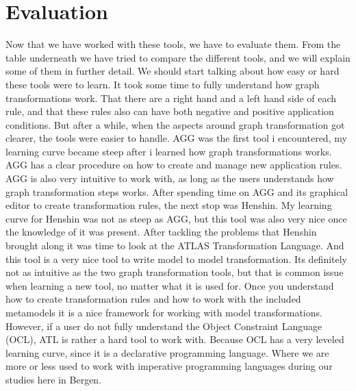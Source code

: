 \section{Evaluation}
\noindent Now that we have worked with these tools, we have to evaluate them.
From the table underneath we have tried to compare the different tools, and we
will explain some of them in further detail. We should start talking about how
easy or hard these tools were to learn. It took some time to fully understand
how graph transformations work. That there are a right hand and a left hand
side of each rule, and that these rules also can have both negative and
positive application conditions. But after a while, when the aspects around
graph transformation got clearer, the tools were easier to handle. AGG was the
first tool i encountered, my learning curve became steep after i learned how
graph transformations works. AGG has a clear procedure on how to create and
manage new application rules. AGG is also very intuitive to work with, as long
as the users understands how graph transformation steps works. After spending
time on AGG and its graphical editor to create transformation rules, the next
stop was Henshin. My learning curve for Henshin was not as steep as AGG, but
this tool was also very nice once the knowledge of it was present. After
tackling the problems that Henshin brought along it was time to look at the
ATLAS Transformation Language. And this tool is a very nice tool to write model
to model transformation. Its definitely not as intuitive as the two graph
transformation tools, but that is common issue when learning a new tool, no
matter what it is used for. Once you understand how to create transformation
rules and how to work with the included metamodels it is a nice framework for
working with model transformations. However, if a user do not fully understand
the Object Constraint Language (OCL), ATL is rather a hard tool to work with.
Because OCL has a very leveled learning curve, since it is a declarative
programming language. Where we are more or less used to work with imperative
programming languages during our studies here in Bergen.

